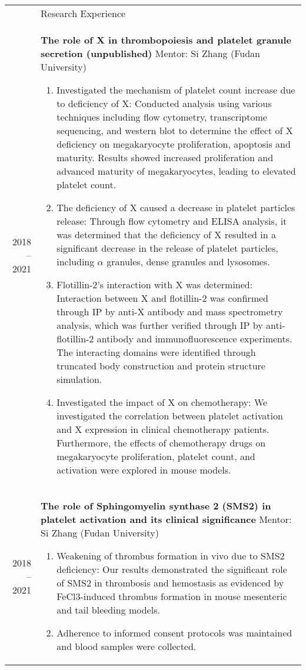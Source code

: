 \documentclass[letterpaper, 11pt]{article}
\newcommand{\headingfont}{\Large\color{LimeGreen}}
\newenvironment{SectionTable}[1]{
	\renewcommand*{\arraystretch}{1.7}
	\setlength{\tabcolsep}{10pt}
	\begin{longtable}{Rp{5.2in}} & #1 \\}
{\end{longtable}\vspace{-.3cm}}
\begin{document}
\begin{SectionTable}{\headingfont Research Experience}
2018 -- 2021 &
\textbf{The role of X in thrombopoiesis and platelet granule secretion (unpublished)} \newline
Mentor: Si Zhang (Fudan University)
\begin{enumerate}
	\item Investigated the mechanism of platelet count increase due to deficiency of X: Conducted analysis using various techniques including flow cytometry, transcriptome sequencing, and western blot to determine the effect of X deficiency on megakaryocyte proliferation, apoptosis and maturity. Results showed increased proliferation and advanced maturity of megakaryocytes, leading to elevated platelet count.
	\item The deficiency of X caused a decrease in platelet particles release: Through flow cytometry and ELISA analysis, it was determined that the deficiency of X resulted in a significant decrease in the release of platelet particles, including $\alpha$ granules, dense granules and lysosomes.
	\item Flotillin-2's interaction with X was determined: Interaction between X and flotillin-2 was confirmed through IP by anti-X antibody and mass spectrometry analysis, which was further verified through IP by anti-flotillin-2 antibody and immunofluorescence experiments. The interacting domains were identified through truncated body construction and protein structure simulation.
	\item Investigated the impact of X on chemotherapy: We investigated the correlation between platelet activation and X expression in clinical chemotherapy patients. Furthermore,  the effects of chemotherapy drugs on megakaryocyte proliferation, platelet count, and activation were explored in mouse models.
\end{enumerate} \\

2018 -- 2021 &
\textbf{The role of Sphingomyelin synthase 2 (SMS2) in platelet activation and its clinical significance} \newline
Mentor:  Si Zhang (Fudan University)
\begin{enumerate}
	\item Weakening of thrombus formation in vivo due to SMS2 deficiency: Our results demonstrated the significant role of SMS2 in thrombosis and hemostasis as evidenced by FeCl3-induced thrombus formation in mouse mesenteric and tail bleeding models.
	\item Adherence to informed consent protocols was maintained and blood samples were collected.
\end{enumerate} \\


\end{SectionTable}
\end{document}
